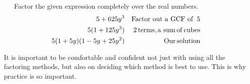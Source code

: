 \begin{example}~~~Factor the given expression completely over the real numbers.
  \begin{eqnarray*}
    5 + 625 y^3 &  & \operatorname{Factor~out~a~GCF~of~} 5\\
    5 (1 + 125 y^3) &  & 2 \operatorname{terms}, \operatorname{a~sum} \operatorname{of}
    \operatorname{cubes}\\
    5 (1 + 5 y) (1 - 5 y + 25 y^2) &  & \operatorname{Our} \operatorname{solution}
  \end{eqnarray*}
\end{example}

It is important to be comfortable and confident not just with using all the
factoring methods, but also on deciding which method is best to use. This is why practice is
so important.